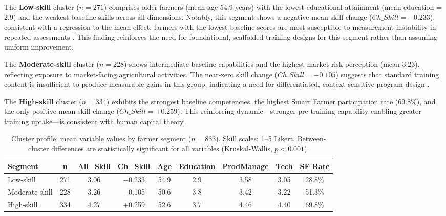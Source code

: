 \documentclass[3p,twocolumn,authoryear]{elsarticle}
\begin{document}
The \textbf{Low-skill} cluster ($n = 271$) comprises older farmers
(mean age 54.9 years) with the lowest educational attainment
(mean education = 2.9) and the weakest baseline skills across all
dimensions.
Notably, this segment shows a negative mean skill change
($Ch\_Skill = -0.233$), consistent with a regression-to-the-mean effect:
farmers with the lowest baseline scores are most susceptible to
measurement instability in repeated assessments \citep{davis2012}.
This finding reinforces the need for foundational, scaffolded training
designs for this segment rather than assuming uniform improvement.

The \textbf{Moderate-skill} cluster ($n = 228$) shows intermediate
baseline capabilities and the highest market risk perception (mean 3.23),
reflecting exposure to market-facing agricultural activities.
The near-zero skill change ($Ch\_Skill = -0.105$) suggests that standard
training content is insufficient to produce measurable gains in this
group, indicating a need for differentiated, context-sensitive program
design \citep{anderson2004}.

The \textbf{High-skill} cluster ($n = 334$) exhibits the strongest
baseline competencies, the highest Smart Farmer participation rate
(69.8\%), and the only positive mean skill change ($Ch\_Skill = +0.259$).
This reinforcing dynamic---stronger pre-training capability enabling
greater training uptake---is consistent with human capital theory
\citep{feder1985,davis2012}.

\begin{table}[htbp]
\centering
\caption{Cluster profile: mean variable values by farmer segment
  ($n = 833$). Skill scales: 1--5 Likert. Between-cluster differences
  are statistically significant for all variables (Kruskal-Wallis,
  $p < 0.001$).}
\label{tab:cluster_profile}
\begin{tabular}{@{}lcccccccc@{}}
\toprule
\textbf{Segment} & \textbf{n} & \textbf{All\_Skill}
  & \textbf{Ch\_Skill} & \textbf{Age}
  & \textbf{Education} & \textbf{ProdManage}
  & \textbf{Tech} & \textbf{SF Rate} \\
\midrule
Low-skill      & 271 & 3.06 & $-$0.233 & 54.9 & 2.9 & 3.58 & 3.05 & 28.8\% \\
Moderate-skill & 228 & 3.26 & $-$0.105 & 50.6 & 3.8 & 3.42 & 3.22 & 51.3\% \\
High-skill     & 334 & 4.27 & $+$0.259 & 52.6 & 3.7 & 4.46 & 4.40 & 69.8\% \\
\bottomrule
\end{tabular}
\end{table}
\end{document}
